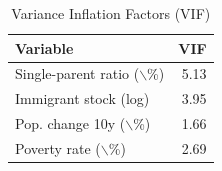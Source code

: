 \begin{table}[ht]
\centering
\caption{Variance Inflation Factors (VIF)} 
\label{tab:vif}
\begin{tabular}{lr}
  \toprule
Variable & VIF \\ 
  \midrule
Single-parent ratio ($\backslash$\%) & 5.13 \\ 
  Immigrant stock (log) & 3.95 \\ 
  Pop. change 10y ($\backslash$\%) & 1.66 \\ 
  Poverty rate ($\backslash$\%) & 2.69 \\ 
   \bottomrule
\end{tabular}
\end{table}
